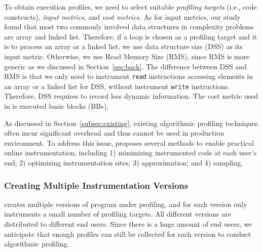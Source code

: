 To obtain execution profiles, we need to select suitable 
\emph{profiling targets} (i.e.,
code constructs), \emph{input metrics}, and \emph{cost metrics}. 
As for input metrics, our study found that most two commonly involved 
data structures in complexity problems 
are array and linked list. Therefore, if a loop is chosen as a profiling target 
and it is to process an array 
or a linked list, we use data structure size (DSS) as its input metric. 
Otherwise, we use Read Memory Size (RMS), 
since RMS is more generic as we discussed in Section~\ref{sec:back}. 
The difference between DSS and RMS is that 
we only need to instrument \texttt{read} instructions accessing elements 
in an array or a linked list for DSS,  without instrument \texttt{write} instructions.
Therefore, DSS requires to record less dynamic information. 
The cost metric used in \Tool is executed basic 
blocks (BBs), 


As discussed in Section~\ref{subsec:existing}, 
existing algorithmic profiling techniques
often incur significant overhead and thus cannot be used in production
environment. To address this issue, \Tool proposes several 
methods to enable practical online instrumentation, including 1) 
minimizing instrumented code at each user's end; 
2) optimizing instrumentation sites;
3) approximation; and 4) sampling. 



\subsubsection{Creating Multiple Instrumentation Versions}

\Tool creates multiple versions of program under profiling, 
and for each version \Tool only instruments a small number of 
profiling targets. 
All different versions are distributed to different end users. 
Since there is a huge amount of end users, 
we anticipate that enough profiles can still be collected 
for each version to conduct algorithmic profiling. 

